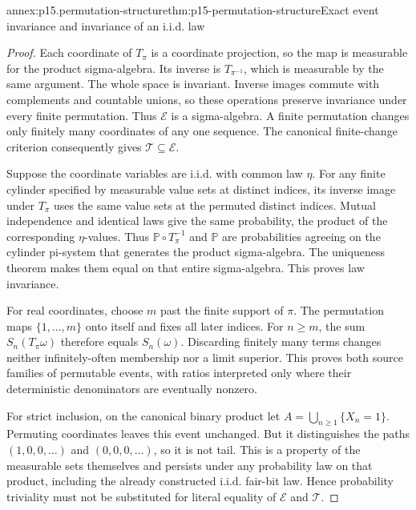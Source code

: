 \begin{annexitem}{annex:p15.permutation-structure}{thm:p15-permutation-structure}{Exact event invariance and invariance of an i.i.d. law}
\begin{proof}
Each coordinate of \(T_\pi\) is a coordinate projection, so
the map is measurable for the product sigma-algebra. Its inverse
is \(T_{\pi^{-1}}\), which is measurable by the same argument.
The whole space is invariant. Inverse images commute with
complements and countable unions, so these operations preserve
invariance under every finite permutation. Thus \(\mathcal E\)
is a sigma-algebra. A finite permutation changes only finitely
many coordinates of any one sequence. The canonical finite-change
criterion consequently gives \(\mathcal T\subseteq\mathcal E\).

Suppose the coordinate variables are i.i.d. with common law
\(\eta\). For any finite cylinder specified by measurable
value sets at distinct indices, its inverse image under \(T_\pi\)
uses the same value sets at the permuted distinct indices.
Mutual independence and identical laws give the same probability,
the product of the corresponding \(\eta\)-values. Thus
\(\mathbb P\circ T_\pi^{-1}\) and \(\mathbb P\) are
probabilities agreeing on the cylinder pi-system that generates
the product sigma-algebra. The uniqueness theorem makes them
equal on that entire sigma-algebra. This proves law invariance.

For real coordinates, choose \(m\) past the finite support
of \(\pi\). The permutation maps \(\{1,\ldots,m\}\)
onto itself and fixes all later indices. For \(n\geq m\),
the sum \(S_n(T_\pi\omega)\) therefore equals \(S_n(\omega)\).
Discarding finitely many terms changes neither infinitely-often
membership nor a limit superior. This proves both source families
of permutable events, with ratios interpreted only where their
deterministic denominators are eventually nonzero.

For strict inclusion, on the canonical binary product let
\(A=\bigcup_{n\geq1}\{X_n=1\}\). Permuting coordinates
leaves this event unchanged. But it distinguishes the paths
\((1,0,0,\ldots)\) and \((0,0,0,\ldots)\), so it is not
tail. This is a property of the measurable sets themselves and
persists under any probability law on that product, including
the already constructed i.i.d. fair-bit law. Hence probability
triviality must not be substituted for literal equality of
\(\mathcal E\) and \(\mathcal T\).
\end{proof}
\end{annexitem}

